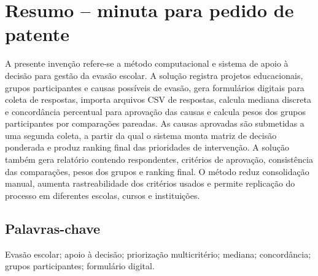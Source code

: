 \section{Resumo -- minuta para pedido de patente}

A presente invenção refere-se a método computacional e sistema de apoio à decisão para gestão da evasão escolar. A solução registra projetos educacionais, grupos participantes e causas possíveis de evasão, gera formulários digitais para coleta de respostas, importa arquivos CSV de respostas, calcula mediana discreta e concordância percentual para aprovação das causas e calcula pesos dos grupos participantes por comparações pareadas. As causas aprovadas são submetidas a uma segunda coleta, a partir da qual o sistema monta matriz de decisão ponderada e produz ranking final das prioridades de intervenção. A solução também gera relatório contendo respondentes, critérios de aprovação, consistência das comparações, pesos dos grupos e ranking final. O método reduz consolidação manual, aumenta rastreabilidade dos critérios usados e permite replicação do processo em diferentes escolas, cursos e instituições.

\subsection{Palavras-chave}

Evasão escolar; apoio à decisão; priorização multicritério; mediana; concordância; grupos participantes; formulário digital.
